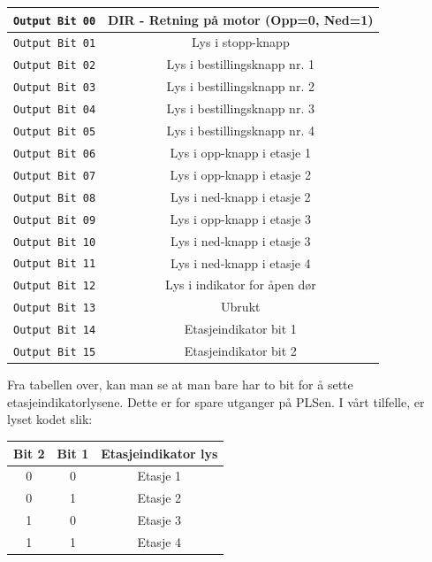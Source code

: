 \begin{alphasection}
\begin{center}
{\begin{tabular}{|c| c|}
 \verb|Output Bit 00| & DIR - Retning på motor (Opp=0, Ned=1) \\ 
 \hline
 \verb|Output Bit 01| & Lys i stopp-knapp \\ 
 \hline
 \verb|Output Bit 02| & Lys i bestillingsknapp nr. 1 \\ 
 \hline
 \verb|Output Bit 03| & Lys i bestillingsknapp nr. 2 \\ 
 \hline
 \verb|Output Bit 04| & Lys i bestillingsknapp nr. 3\\ 
 \hline
 \verb|Output Bit 05| & Lys i bestillingsknapp nr. 4\\ 
 \hline
 \verb|Output Bit 06| & Lys i opp-knapp i etasje 1 \\ 
 \hline
 \verb|Output Bit 07| & Lys i opp-knapp i etasje 2 \\ 
 \toprule
 
 \verb|Output Bit 08| & Lys i ned-knapp i etasje 2 \\ 
 \hline
 \verb|Output Bit 09| &Lys i opp-knapp i etasje 3 \\ 
 \hline
 \verb|Output Bit 10| & Lys i ned-knapp i etasje 3\\ 
 \hline
 \verb|Output Bit 11| & Lys i ned-knapp i etasje 4\\ 
 \hline
 \verb|Output Bit 12| & Lys i indikator for åpen dør \\ 
 \hline
 \verb|Output Bit 13| & Ubrukt \\ 
 \hline
 \verb|Output Bit 14| &Etasjeindikator bit 1 \\ 
 \hline
 \verb|Output Bit 15| &Etasjeindikator bit 2 \\ 
 \toprule
\end{tabular}}
\end{center}

Fra tabellen over, kan man se at man bare har to bit for å sette etasjeindikatorlysene. Dette er for spare utganger på PLSen. I vårt tilfelle, er lyset kodet slik:

\begin{center}
 {\begin{tabular}{|c| c| c|} 
 \hline
 \textbf{Bit 2} & \textbf{Bit 1} & \textbf{Etasjeindikator lys} \\ 
 \toprule
 0 & 0 & Etasje 1 \\ 
 \hline
 0 & 1 & Etasje 2 \\
 \hline
 1 & 0 & Etasje 3 \\
 \hline
 1 & 1 & Etasje 4 \\
 \toprule
\end{tabular}}
\end{center}


\end{alphasection}
